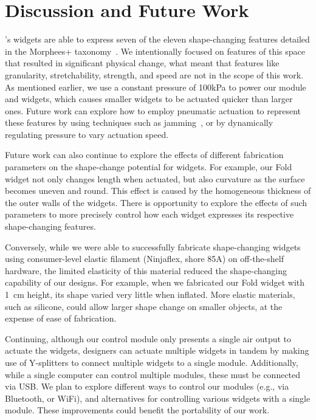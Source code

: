   \section{Discussion and Future Work}
    \mp's widgets are able to express seven of the eleven shape-changing
    features detailed in the Morphees+ taxonomy~\cite{10.1145/3173574.3174193}.
    We intentionally focused on features of this space that resulted in
    significant physical change, what meant that features like granularity,
    stretchability, strength, and speed are not in the scope of this work. As
    mentioned earlier, we use a constant pressure of 100kPa to power our module
    and widgets, which causes smaller widgets to be actuated quicker than larger
    ones. Future work can explore how to employ pneumatic actuation to represent
    these features by using techniques such as jamming~\cite{Follmer:2012cx}, or
    by dynamically regulating pressure to vary actuation speed.
      
    Future work can also continue to explore the effects of different
    fabrication parameters on the shape-change potential for \mp widgets. For
    example, our Fold widget not only changes length when actuated, but also
    curvature as the surface becomes uneven and round. This effect is caused by
    the homogeneous thickness of the outer walls of the widgets. There is
    opportunity to explore the effects of such parameters to more precisely
    control how each widget expresses its respective shape-changing features.
      
    Conversely, while we were able to successfully fabricate shape-changing
    widgets using consumer-level elastic filament (Ninjaflex, shore 85A) on
    off-the-shelf hardware, the limited elasticity of this material reduced the
    shape-changing capability of our designs. For example, when we fabricated
    our Fold widget with 1~cm height, its shape varied very little when
    inflated. More elastic materials, such as silicone, could allow larger shape
    change on smaller objects, at the expense of ease of fabrication.
      
    Continuing, although our control module only presents a single air output to
    actuate the widgets, designers can actuate multiple widgets in tandem by
    making use of Y-splitters to connect multiple widgets to a single module.
    Additionally, while a single computer can control multiple modules, these
    must be connected via USB. We plan to explore different ways to control our
    modules (e.g., via Bluetooth, or WiFi), and alternatives for controlling
    various widgets with a single module. These improvements could benefit the
    portability of our work.
      
